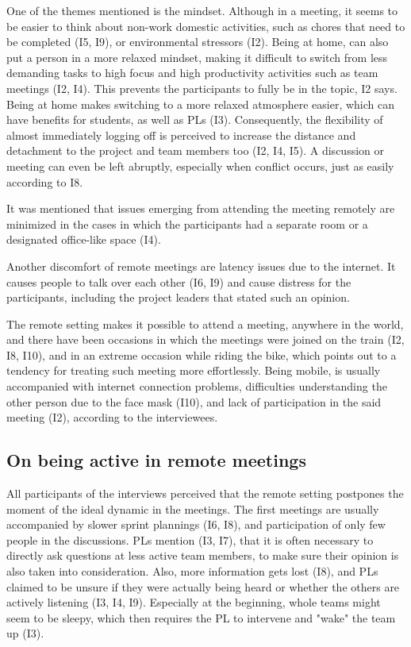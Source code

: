 One of the themes mentioned is the mindset. Although in a meeting, it seems to be easier to think about non-work domestic activities, such as chores that need to be completed (I5, I9), or environmental stressors (I2). Being at home, can also put a person in a more relaxed mindset, making it difficult to switch from less demanding tasks to high focus and high productivity activities such as team meetings (I2, I4). This prevents the participants to fully be in the topic, I2 says. Being at home makes switching to a more relaxed atmosphere easier, which can have benefits for students, as well as PLs (I3). Consequently, the flexibility of almost immediately logging off is perceived to increase the distance and detachment to the project and team members too (I2, I4, I5). A discussion or meeting can even be left abruptly, especially when conflict occurs, just as easily according to I8. 

It was mentioned that issues emerging from attending the meeting remotely are minimized in the cases in which the participants had a separate room or a designated office-like space (I4).

Another discomfort of remote meetings are latency issues due to the internet. It causes people to talk over each other (I6, I9) and cause distress for the participants, including the project leaders that stated such an opinion. 

The remote setting makes it possible to attend a meeting, anywhere in the world, and there have been occasions in which the meetings were joined on the train (I2, I8,  I10), and in an extreme occasion while riding the bike, which points out to a tendency for treating such meeting more effortlessly. Being mobile, is usually accompanied with internet connection problems, difficulties understanding the other person due to the face mask (I10), and lack of participation in the said meeting (I2), according to the interviewees.  

\subsection{On being active in remote meetings}

All participants of the interviews perceived that the remote setting postpones the moment of the ideal dynamic in the meetings. The first meetings are usually accompanied by slower sprint plannings (I6, I8), and participation of only few people in the discussions. PLs mention (I3, I7), that it is often necessary to directly ask questions at less active team members, to make sure their opinion is also taken into consideration. Also, more information gets lost (I8), and PLs claimed to be unsure if they were actually being heard or whether the others are actively listening (I3, I4, I9). Especially at the beginning, whole teams might seem to be sleepy, which then requires the PL to intervene and "wake" the team up (I3). 

